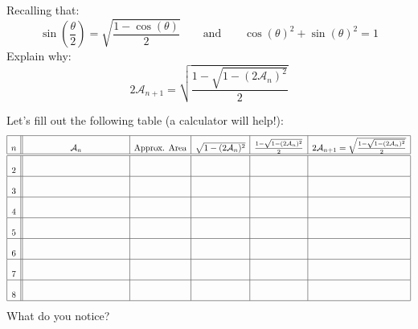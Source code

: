 \documentclass[nooutcomes]{ximera}
\begin{document}
\begin{problem}
Recalling that:
\[
\sin\left(\frac{\theta}{2}\right) = \sqrt{\frac{1-\cos(\theta)}{2}}
\qquad\text{and}\qquad
\cos(\theta)^2 + \sin(\theta)^2 = 1
\]
Explain why:
\[
2 \mathcal{A}_{n+1} = \sqrt{\frac{1 - \sqrt{1 - (2\mathcal{A}_n)^2}}{2}}
\]
\end{problem}


\begin{problem} 
Let's fill out the following table (a calculator will help!):
\[
\begin{array}{| c || c | c | c | c | c |}
\hline %
n  & \mathcal{A}_n & \text{Approx. Area} & \sqrt{1-(2\mathcal{A}_n)^2} & \frac{1 - \sqrt{1-(2\mathcal{A}_n)^2} }{2} &\rule[0mm]{0mm}{6mm}2\mathcal{A}_{n+1} =\sqrt{\frac{1 - \sqrt{1-(2\mathcal{A}_n)^2} }{2}} \\ \hline\hline 
2 &\rule[7mm]{20mm}{0mm}\hspace{20mm}  &\hspace{20mm}  &\hspace{20mm}  & \hspace{20mm} & \hspace{20mm}\\ \hline
3 &\rule[0mm]{0mm}{7mm}   &  &  & &   \\ \hline
4 &\rule[0mm]{0mm}{7mm}   &  &  & &   \\ \hline
5 &\rule[0mm]{0mm}{7mm}   &  &  & &   \\ \hline
6 &\rule[0mm]{0mm}{7mm}   &  &  & &   \\ \hline
7 &\rule[0mm]{0mm}{7mm}   &  &  & &   \\ \hline
8 &\rule[0mm]{0mm}{7mm}   &  &  & &   \\ \hline
\end{array}
\]
What do you notice?
\end{problem}
\end{document}
